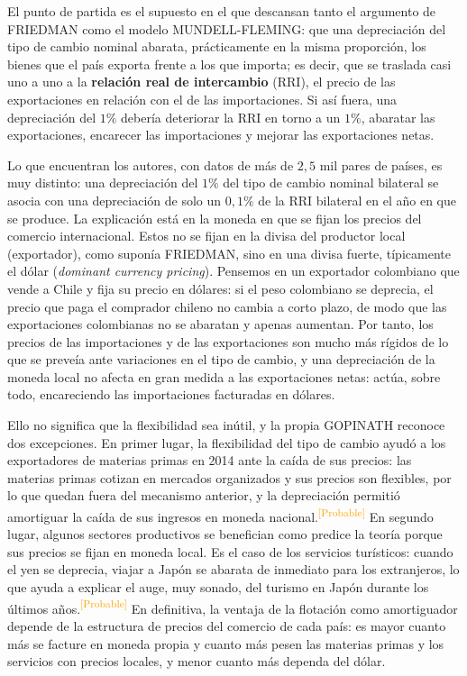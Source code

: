 \documentclass[10pt,a4paper]{article}
\begin{document}
El punto de partida es el supuesto en el que descansan tanto el argumento de FRIEDMAN como el modelo MUNDELL-FLEMING: que una depreciación del tipo de cambio nominal abarata, prácticamente en la misma proporción, los bienes que el país exporta frente a los que importa; es decir, que se traslada casi uno a uno a la \textbf{relación real de intercambio} (RRI), el precio de las exportaciones en relación con el de las importaciones. Si así fuera, una depreciación del $1\%$ debería deteriorar la RRI en torno a un $1\%$, abaratar las exportaciones, encarecer las importaciones y mejorar las exportaciones netas.

Lo que encuentran los autores, con datos de más de $2,5$ mil pares de países, es muy distinto: una depreciación del $1\%$ del tipo de cambio nominal bilateral se asocia con una depreciación de solo un $0,1\%$ de la RRI bilateral en el año en que se produce. La explicación está en la moneda en que se fijan los precios del comercio internacional. Estos no se fijan en la divisa del productor local (exportador), como suponía FRIEDMAN, sino en una divisa fuerte, típicamente el dólar (\textit{dominant currency pricing}). Pensemos en un exportador colombiano que vende a Chile y fija su precio en dólares: si el peso colombiano se deprecia, el precio que paga el comprador chileno no cambia a corto plazo, de modo que las exportaciones colombianas no se abaratan y apenas aumentan. Por tanto, los precios de las importaciones y de las exportaciones son mucho más rígidos de lo que se preveía ante variaciones en el tipo de cambio, y una depreciación de la moneda local no afecta en gran medida a las exportaciones netas: actúa, sobre todo, encareciendo las importaciones facturadas en dólares.

Ello no significa que la flexibilidad sea inútil, y la propia GOPINATH reconoce dos excepciones. En primer lugar, la flexibilidad del tipo de cambio ayudó a los exportadores de materias primas en 2014 ante la caída de sus precios: las materias primas cotizan en mercados organizados y sus precios son flexibles, por lo que quedan fuera del mecanismo anterior, y la depreciación permitió amortiguar la caída de sus ingresos en moneda nacional.\textcolor{orange}{\textsuperscript{[Probable]}} En segundo lugar, algunos sectores productivos se benefician como predice la teoría porque sus precios se fijan en moneda local. Es el caso de los servicios turísticos: cuando el yen se deprecia, viajar a Japón se abarata de inmediato para los extranjeros, lo que ayuda a explicar el auge, muy sonado, del turismo en Japón durante los últimos años.\textcolor{orange}{\textsuperscript{[Probable]}} En definitiva, la ventaja de la flotación como amortiguador depende de la estructura de precios del comercio de cada país: es mayor cuanto más se facture en moneda propia y cuanto más pesen las materias primas y los servicios con precios locales, y menor cuanto más dependa del dólar.
\end{document}
